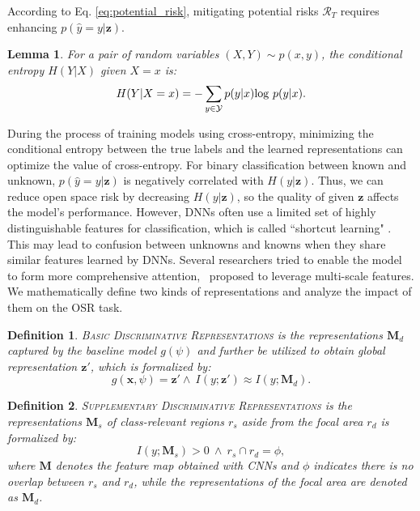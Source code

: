 \documentclass[letterpaper]{article} %
\newtheorem{lemma}{Lemma}
\newtheorem{definition}{Definition}
\begin{document}
According to Eq. \eqref{eq:potential_risk}, mitigating potential risks $\mathcal{R}_T$ requires enhancing $p(\hat{y}=y|\boldsymbol{z})$.
\begin{lemma} \cite{cover2012elements}
For a pair of random variables $(X,Y)\sim p(x,y)$, the conditional entropy $H(Y|X)$ given $X=x$ is:
\begin{equation}
H(Y|X=x)=-\sum_{y\in\mathcal{Y}}p(y|x){\rm log}\ p(y|x).
\label{eq:cond_entro}
\end{equation}
\end{lemma}
During the process of training models using cross-entropy, minimizing the conditional entropy between the true labels and the learned representations can optimize the value of cross-entropy. For binary classification between known and unknown, $p(\hat{y}=y|\boldsymbol{z})$ is negatively correlated with $H(y|\boldsymbol{z})$. Thus, we can reduce open space risk by decreasing $H(y|\boldsymbol{z})$, so the quality of given $\boldsymbol{z}$ affects the model's performance. However, DNNs often use a limited set of highly distinguishable features for classification, which is called ``shortcut learning" \cite{geirhos2020shortcut}. This may lead to confusion between unknowns and knowns when they share similar features learned by DNNs. Several researchers tried to enable the model to form more comprehensive attention,~\cite{wang2018deep} proposed to leverage multi-scale features. We mathematically define two kinds of representations and analyze the impact of them on the OSR task.

\begin{definition}
\textsc{Basic Discriminative Representations} is the representations $\boldsymbol{M}_d$ captured by the baseline model $g(\psi)$ and further be utilized to obtain global representation $\boldsymbol{z}'$, which is formalized by:
\begin{equation}
g(\boldsymbol{x},\psi)=\boldsymbol{z}' \wedge\ I(y;\boldsymbol{z}')\approx I(y;\boldsymbol{M}_d).
\label{eq:defin_fd}
\end{equation}
\end{definition}

\begin{definition}
\textsc{Supplementary Discriminative Representations} is the representations $\boldsymbol{M}_s$ of class-relevant regions $r_s$ aside from the focal area $r_d$ is formalized by:
\begin{equation}
I(y;\boldsymbol{M}_s)>0\ \wedge\ r_s\cap r_d=\phi,
\label{eq:defin_fs}
\end{equation}
where $\boldsymbol{M}$ denotes the feature map obtained with CNNs and $\phi$ indicates there is no overlap between $r_s$ and $r_d$, while the representations of the focal area are denoted as $\boldsymbol{M}_d$.
\end{definition}
\end{document}
